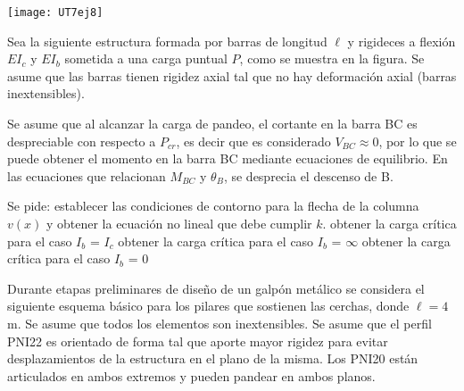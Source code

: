 \begin{center}
	\texttt{[image: UT7ej8]}
\end{center}

%
%
%
%
%


\ejercicio

Sea la siguiente estructura formada por barras de longitud $\ell$ y rigideces a flexión $EI_c$ y $EI_b$ sometida a una carga puntual $P$, como se muestra en la figura. Se asume que las barras tienen rigidez axial tal que no hay deformación axial (barras inextensibles).

\begin{center}
		\def\svgwidth{0.5\textwidth}
		
\end{center} 

Se asume que al alcanzar la carga de pandeo, el cortante en la barra BC es despreciable con respecto a $P_{cr}$, es decir que es considerado $V_{BC} \approx 0$, por lo que se puede obtener el momento en la barra BC mediante ecuaciones de equilibrio. En las ecuaciones que  relacionan $M_{BC}$ y $\theta_B$, se desprecia el descenso de B. 

Se pide:
\parte establecer las condiciones de contorno para la flecha de la columna $v(x)$ y obtener la ecuación no lineal que debe cumplir $k$.
\parte obtener la carga crítica para el caso $I_b$ = $I_c$ 
\parte obtener la carga crítica para el caso $I_b$ = $\infty$
\parte obtener la carga crítica para el caso $I_b$ = 0


\ejercicio

Durante etapas preliminares de diseño de un galpón metálico se considera el siguiente esquema básico para los pilares que sostienen las cerchas, donde $\ell=4$ m. Se asume que todos los elementos son inextensibles. Se asume que el perfil PNI22 es orientado de forma tal que aporte mayor rigidez para evitar desplazamientos de la estructura en el plano de la misma. Los PNI20 están articulados en ambos extremos y pueden pandear en ambos planos.

